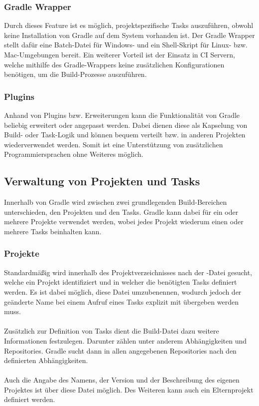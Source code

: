 \subsubsection{Gradle Wrapper}
Durch dieses Feature ist es möglich, projektspezifische Tasks auszuführen, obwohl keine Installation von Gradle auf dem System vorhanden ist. Der Gradle Wrapper stellt dafür eine Batch-Datei für Windows- und ein Shell-Skript für Linux- bzw. Mac-Umgebungen bereit. Ein weiterer Vorteil ist der Einsatz in \gls{CI} Servern, welche mithilfe des Gradle-Wrappers keine zusätzlichen Konfigurationen benötigen, um die Build-Prozesse auszuführen.

\subsubsection{Plugins}
Anhand von Plugins bzw. Erweiterungen kann die Funktionalität von Gradle beliebig erweitert oder angepasst werden. Dabei dienen diese als Kapselung von Build- oder Task-Logik und können bequem verteilt bzw. in anderen Projekten wiederverwendet werden. Somit ist eine Unterstützung von zusätzlichen Programmiersprachen ohne Weiteres möglich.

\subsection{Verwaltung von Projekten und Tasks}
Innerhalb von Gradle  wird zwischen zwei grundlegenden Build-Bereichen unterschieden, den Projekten und den Tasks. Gradle kann dabei für ein oder mehrere Projekte verwendet werden, wobei jedes Projekt wiederum einen oder mehrere Tasks beinhalten kann.

\subsubsection{Projekte}
Standardmäßig wird innerhalb des Projektverzeichnisses nach der -Datei gesucht, welche ein Projekt identifiziert und in welcher die benötigten Tasks definiert werden. Es ist dabei möglich, diese Datei umzubenennen, wodurch jedoch der geänderte Name bei einem Aufruf eines Tasks explizit mit übergeben werden muss.\\
\\
Zusätzlich zur Definition von Tasks dient die Build-Datei dazu weitere Informationen festzulegen. Darunter zählen unter anderem Abhängigkeiten und Repositories. Gradle sucht dann in allen angegebenen Repositories nach den definierten Abhängigkeiten.\\
\\
Auch die Angabe des Namens, der Version und der Beschreibung des eigenen Projektes ist über diese Datei möglich. Des Weiteren kann auch ein Elternprojekt definiert werden.

